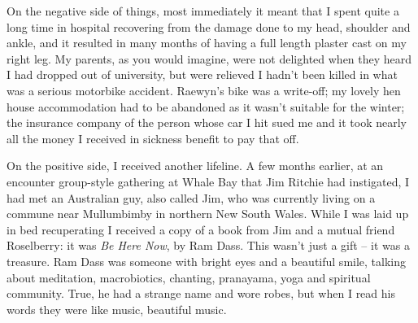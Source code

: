 On the negative side of things, most immediately it meant that I spent
quite a long time in hospital recovering from the damage done to my
head, shoulder and ankle, and it resulted in many months of having a
full length plaster cast on my right leg. My parents, as you would
imagine, were not delighted when they heard I had dropped out of
university, but were relieved I hadn't been killed in what was a serious
motorbike accident. Raewyn's bike was a write-off; my lovely hen house
accommodation had to be abandoned as it wasn't suitable for the winter;
the insurance company of the person whose car I hit sued me and it took
nearly all the money I received in sickness benefit to pay that off.

\enlargethispage{\baselineskip}

On the positive side, I received another lifeline. A few months earlier,
at an encounter group-style gathering at Whale Bay that Jim Ritchie had
instigated, I had met an Australian guy, also called Jim, who was currently
living on a commune near Mullumbimby in northern New South Wales. While
I was laid up in bed recuperating I received a copy of a book from Jim
and a mutual friend Roselberry: it was \emph{Be Here Now}, by Ram Dass.
This wasn't just a gift -- it was a treasure. Ram Dass was someone with
bright eyes and a beautiful smile, talking about meditation,
macrobiotics, chanting, pranayama, yoga and spiritual community. True,
he had a strange name and wore robes, but when I read his words they
were like music, beautiful music.

